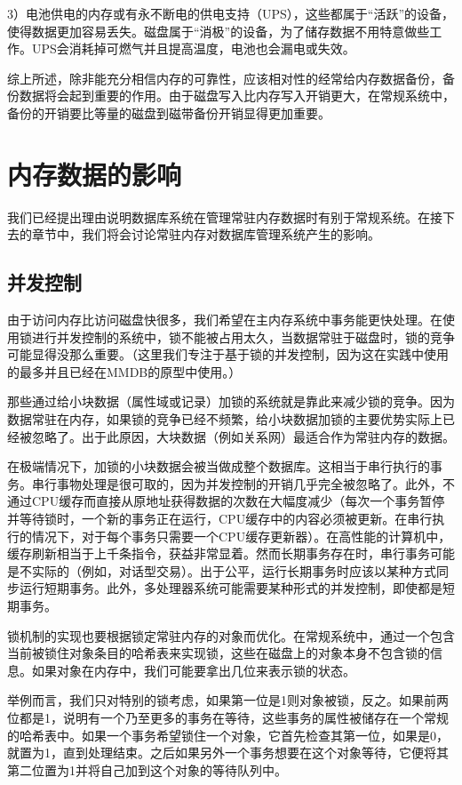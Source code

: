 \documentclass[translation]{zjutreport}
\begin{document}
3）电池供电的内存或有永不断电的供电支持（UPS），这些都属于“活跃”的设备，使得数据更加容易丢失。磁盘属于“消极”的设备，为了储存数据不用特意做些工作。UPS会消耗掉可燃气并且提高温度，电池也会漏电或失效。

综上所述，除非能充分相信内存的可靠性，应该相对性的经常给内存数据备份，备份数据将会起到重要的作用。由于磁盘写入比内存写入开销更大，在常规系统中，备份的开销要比等量的磁盘到磁带备份开销显得更加重要。

\chapter{内存数据的影响}
我们已经提出理由说明数据库系统在管理常驻内存数据时有别于常规系统。在接下去的章节中，我们将会讨论常驻内存对数据库管理系统产生的影响。

\section{并发控制}
由于访问内存比访问磁盘快很多，我们希望在主内存系统中事务能更快处理。在使用锁进行并发控制的系统中，锁不能被占用太久，当数据常驻于磁盘时，锁的竞争可能显得没那么重要。（这里我们专注于基于锁的并发控制，因为这在实践中使用的最多并且已经在MMDB的原型中使用。）

那些通过给小块数据（属性域或记录）加锁的系统就是靠此来减少锁的竞争。因为数据常驻在内存，如果锁的竞争已经不频繁，给小块数据加锁的主要优势实际上已经被忽略了。出于此原因，大块数据（例如关系网）最适合作为常驻内存的数据。

在极端情况下，加锁的小块数据会被当做成整个数据库。这相当于串行执行的事务。串行事物处理是很可取的，因为并发控制的开销几乎完全被忽略了。此外，不通过CPU缓存而直接从原地址获得数据的次数在大幅度减少（每次一个事务暂停并等待锁时，一个新的事务正在运行，CPU缓存中的内容必须被更新。在串行执行的情况下，对于每个事务只需要一个CPU缓存更新器）。在高性能的计算机中，缓存刷新相当于上千条指令，获益非常显着。然而长期事务存在时，串行事务可能是不实际的（例如，对话型交易）。出于公平，运行长期事务时应该以某种方式同步运行短期事务。此外，多处理器系统可能需要某种形式的并发控制，即使都是短期事务。

锁机制的实现也要根据锁定常驻内存的对象而优化。在常规系统中，通过一个包含当前被锁住对象条目的哈希表来实现锁，这些在磁盘上的对象本身不包含锁的信息。如果对象在内存中，我们可能要拿出几位来表示锁的状态。

举例而言，我们只对特别的锁考虑，如果第一位是1则对象被锁，反之。如果前两位都是1，说明有一个乃至更多的事务在等待，这些事务的属性被储存在一个常规的哈希表中。如果一个事务希望锁住一个对象，它首先检查其第一位，如果是0，就置为1，直到处理结束。之后如果另外一个事务想要在这个对象等待，它便将其第二位置为1并将自己加到这个对象的等待队列中。
\end{document}
